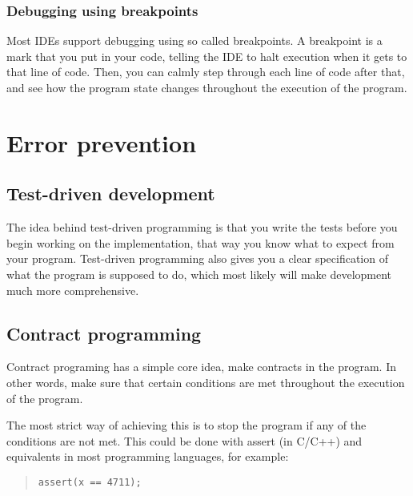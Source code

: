 \documentclass[11pt,a4paper,twoside]{article}
\begin{document}
\subsubsection{Debugging using breakpoints}

Most IDEs support debugging using so called breakpoints. A breakpoint is a mark
that you put in your code, telling the IDE to halt execution when it gets to
that line of code. Then, you can calmly step through each line of code after
that, and see how the program state changes throughout the execution of the
program.


\section{Error prevention}

\subsection{Test-driven development}

The idea behind test-driven programming is that you write the tests before you
begin working on the implementation, that way you know what to expect from your
program. Test-driven programming also gives you a clear specification of
what the program is supposed to do, which most likely will make development
much more comprehensive.


\subsection{Contract programming}

Contract programing has a simple core idea, make contracts in the program. In
other words, make sure that certain conditions are met throughout the execution
of the program.

The most strict way of achieving this is to stop the program if any of the
conditions are not met. This could be done with assert (in C/C++) and
equivalents in most programming languages, for example:

\begin{quote}
\begin{verbatim}
assert(x == 4711);
\end{verbatim}
\end{quote}
\end{document}
